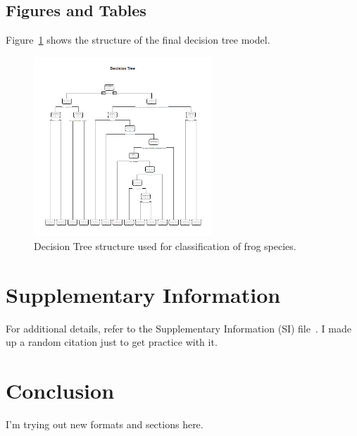 \documentclass{article}\usepackage[]{graphicx}\usepackage[]{xcolor}
\begin{document}
\subsection{Figures and Tables}
Figure~\ref{fig:tree} shows the structure of the final decision tree model. 

\begin{figure}[h]
    \centering
    \includegraphics[width=0.6\textwidth]{../results/decision_tree.png}
    \caption{Decision Tree structure used for classification of frog species.}
    \label{fig:tree}
\end{figure}

\section{Supplementary Information}
For additional details, refer to the Supplementary Information (SI) file~\cite{Reuman2024}. I made up a random citation just to get practice with it. 

\section{Conclusion}
I'm trying out new formats and sections here.



\end{document}
